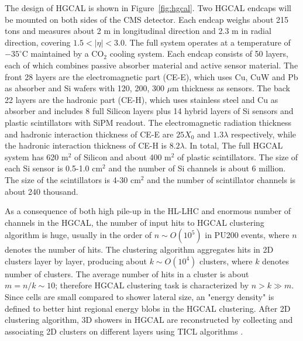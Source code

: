 The design of HGCAL \cite{Collaboration:2293646} is shown in Figure~\ref{fig:hgcal}. Two HGCAL endcaps will be mounted on both sides of the CMS detector. Each endcap weighs about 215 tons and measures about 2 m in longitudinal direction and 2.3 m in radial direction, covering $1.5<|\eta|<3.0$. The full system operates at a temperature of $-35^\circ$C maintained by a CO$_2$ cooling system. Each endcap consists of 50 layers, each of which combines passive absorber material and active sensor material. The front 28 layers are the electromagnetic part (CE-E), which uses Cu, CuW and Pb as absorber and Si wafers with 120, 200, 300 $\mu$m thickness as sensors. The back 22 layers are the hadronic part (CE-H), which uses stainless steel and Cu as absorber and includes 8 full Silicon layers plus 14 hybrid layers of Si sensors and plastic scintillators with SiPM readout. The electromagnetic radiation thickness and hadronic interaction thickness of CE-E are $25 X_0$ and $1.3 \lambda$ respectively, while the hadronic interaction thickness of CE-H is $8.2 \lambda$. In total, The full HGCAL system has 620 m$^2$ of Silicon and about 400 m$^2$ of plastic scintillators. The size of each Si sensor is 0.5-1.0 cm$^2$ and the number of Si channels is about 6 million. The size of the scintillators is 4-30 cm$^2$ and the number of scintillator channels is about 240 thousand.


As a consequence of both high pile-up in the HL-LHC and enormous number of channels in the HGCAL, the number of input hits to HGCAL clustering algorithm is huge, usually in the order of $n\sim O(10^5)$
in PU200 events, where $n$ denotes the number of hits. The clustering algorithm aggregates hits in 2D clusters layer by layer, producing about $k \sim O(10^4)$ clusters, where $k$ denotes number of clusters. The average number of hits in a cluster is about $m=n/k \sim 10$; therefore HGCAL clustering task is characterized by $n> k \gg m$. Since cells are small compared to shower lateral size, an "energy density" is defined to better hint regional energy blobs in the HGCAL clustering. After 2D clustering algorithm, 3D showers in HGCAL are reconstructed by collecting and associating 2D clusters on different layers using TICL algorithms \cite{ticlwebsite}. 

